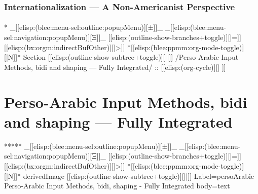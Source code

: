 \begin{whenOrg}
\begin{verblatex}

\begin{frame}[fragile,label=part_internationalization]
    \frametitle{Internationalization --- A Non-Americanist Perspective}
    \framesubtitle{}

    \tableofcontents

\end{frame}
\end{verblatex}



\begin{whenOrg}
*  _[[elisp:(blee:menu-sel:outline:popupMenu)][±]]_ _[[elisp:(blee:menu-sel:navigation:popupMenu)][Ξ]]_ [[elisp:(outline-show-branches+toggle)][|=]] [[elisp:(bx:orgm:indirectBufOther)][|>]] *[[elisp:(blee:ppmm:org-mode-toggle)][|N]]*  Section    [[elisp:(outline-show-subtree+toggle)][||]]   /Perso-Arabic Input Methods, bidi and shaping --- Fully Integrated/ ::  [[elisp:(org-cycle)][| ]]
\end{whenOrg}

\section{Perso-Arabic Input Methods, bidi and shaping --- Fully Integrated}


\begin{whenOrg}
*****  _[[elisp:(blee:menu-sel:outline:popupMenu)][±]]_ _[[elisp:(blee:menu-sel:navigation:popupMenu)][Ξ]]_ [[elisp:(outline-show-branches+toggle)][|=]] [[elisp:(bx:orgm:indirectBufOther)][|>]] *[[elisp:(blee:ppmm:org-mode-toggle)][|N]]*  derivedImage [[elisp:(outline-show-subtree+toggle)][||]] Label=persoArabic Perso-Arabic Input Methods, bidi, shaping - Fully Integrated body=text
\end{whenOrg}


\end{whenOrg}
